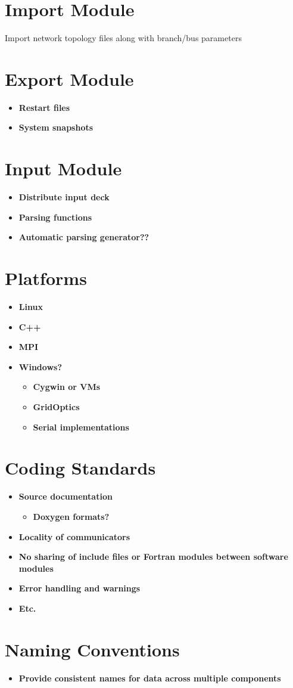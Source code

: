 \documentclass[12pt]{article}
\begin{document}
\section{Import Module}
Import network topology files along with branch/bus parameters

\section{Export Module}
\begin{itemize}
\item{\bf Restart files}
\item{\bf System snapshots}
\end{itemize}

\section{Input Module}
\begin{itemize}
\item{\bf Distribute input deck}
\item{\bf Parsing functions}
\item{\bf Automatic parsing generator??}
\end{itemize}

\section{Platforms}
\begin{itemize}
\item{\bf Linux}
\item{\bf C++}
\item{\bf MPI}
\item{\bf Windows?}
\begin{itemize}
\item{\bf Cygwin or VMs}
\item{\bf GridOptics}
\item{\bf Serial implementations}
\end{itemize}
\end{itemize}

\section{Coding Standards}
\begin{itemize}
\item{\bf Source documentation}
\begin{itemize}
\item{\bf Doxygen formats?}
\end{itemize}
\item{\bf Locality of communicators}
\item{\bf No sharing of include files or Fortran modules between software
modules}
\item{\bf Error handling and warnings}
\item{\bf Etc.}
\end{itemize}

\section{Naming Conventions}
\begin{itemize}
\item{\bf Provide consistent names for data across multiple components}
\end{itemize}
\end{document}

